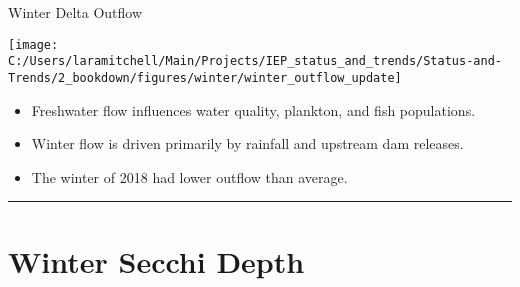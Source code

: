 \documentclass[
]{book}
\providecommand{\tightlist}{%
  \setlength{\itemsep}{0pt}\setlength{\parskip}{0pt}}
\begin{document}
Winter Delta Outflow

\texttt{[image: C:/Users/laramitchell/Main/Projects/IEP\_status\_and\_trends/Status-and-Trends/2\_bookdown/figures/winter/winter\_outflow\_update]}

\begin{itemize}
\tightlist
\item
  Freshwater flow influences water quality, plankton, and fish populations.
\item
  Winter flow is driven primarily by rainfall and upstream dam releases.
\item
  The winter of 2018 had lower outflow than average.
\end{itemize}

\begin{center}\rule{0.5\linewidth}{0.5pt}\end{center}

\hypertarget{winter-secchi-depth}{%
\section{Winter Secchi Depth}\label{winter-secchi-depth}}
\end{document}
